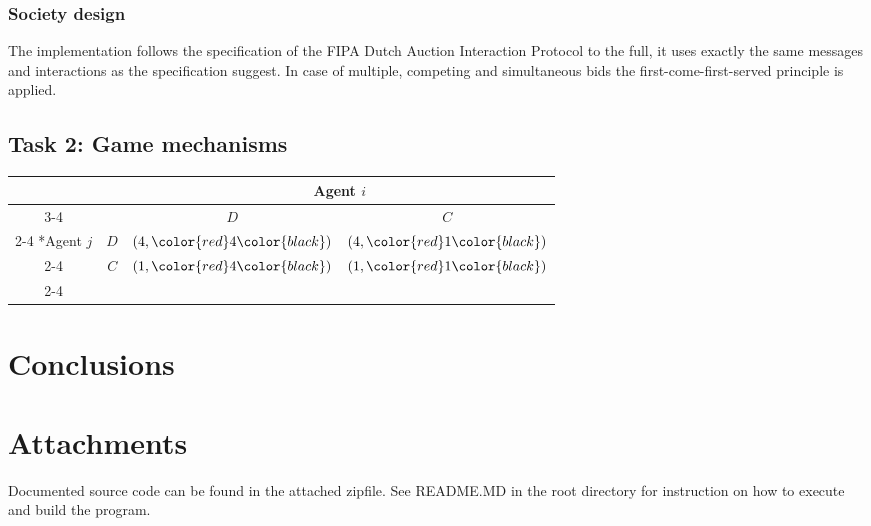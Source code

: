 \documentclass[a4paper, 11pt]{article}
\begin{document}
\subsubsection*{Society design}
The implementation follows the specification of the FIPA Dutch Auction Interaction Protocol \citep{fipa_dutch} to the full, it uses exactly the same messages and interactions as the specification suggest. In case of multiple, competing and simultaneous bids the first-come-first-served principle is applied.
\subsection*{Task 2: Game mechanisms}
 \begin{table}[H]
    \setlength{\extrarowheight}{2pt}
    \begin{tabular}{*{4}{c|}}
      \multicolumn{2}{c}{} & \multicolumn{2}{c}{Agent \color{red}$i$}\\\cline{3-4}
      \multicolumn{1}{c}{} &  & $D$  & $C$ \\\cline{2-4}
      \multirow{2}*{Agent $j$}  & $D$ & $(4,\color{red}4\color{black})$ & $(4,\color{red}1\color{black})$ \\\cline{2-4}
      & $C$ & $(1,\color{red}4\color{black})$ & $(1,\color{red}1\color{black})$ \\\cline{2-4}
    \end{tabular}
  \end{table}
\section*{Conclusions}


\section*{Attachments}
Documented source code can be found in the attached zipfile. See README.MD in the root directory for instruction on how to execute and build the program.

{}

\end{document}
